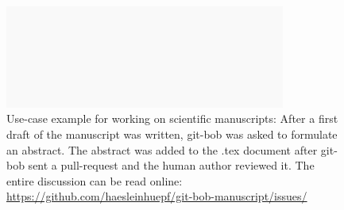 \documentclass{ecai}
\begin{document}
\begin{figure}[h]
\centering
\includegraphics[width=0.82\textwidth]{example_abstract_generation.png}
\caption{Use-case example for working on scientific manuscripts: After a first draft of the manuscript was written, git-bob was asked to formulate an abstract. The abstract was added to the .tex document after git-bob sent a pull-request and the human author reviewed it. The entire discussion can be read online: \url{https://github.com/haesleinhuepf/git-bob-manuscript/issues/}
\newline
\newline
}
\label{fig:exampleplotting}
\end{figure}
\end{document}
